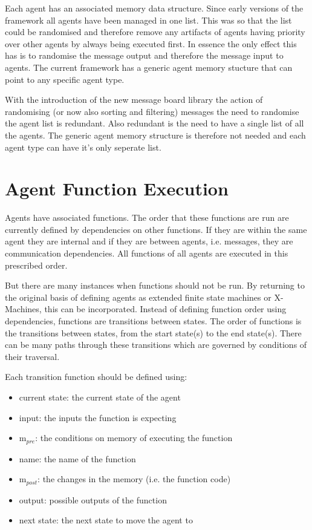 \documentclass[a4paper,12pt]{article}
\begin{document}
Each agent has an associated memory data structure. Since early versions of the framework all agents have been managed in one list. This was so that the list could be randomised and therefore remove any artifacts of agents having priority over other agents by always being executed first. In essence the only effect this has is to randomise the message output and therefore the message input to agents. The current framework has a generic agent memory stucture that can point to any specific agent type.

With the introduction of the new message board library the action of randomising (or now also sorting and filtering) messages the need to randomise the agent list is redundant. Also redundant is the need to have a single list of all the agents. The generic agent memory structure is therefore not needed and each agent type can have it's only seperate list.

\section{Agent Function Execution}

Agents have associated functions. The order that these functions are run are currently defined by dependencies on other functions. If they are within the same agent they are internal and if they are between agents, i.e. messages, they are communication dependencies. All functions of all agents are executed in this prescribed order.

But there are many instances when functions should not be run. By returning to the original basis of defining agents as extended finite state machines or X-Machines, this can be incorporated. Instead of defining function order using dependencies, functions are transitions between states. The order of functions is the transitions between states, from the start state(s) to the end state(s). There can be many paths through these transitions which are governed by conditions of their traversal. 

Each transition function should be defined using:

\begin{itemize}
\item current state: the current state of the agent
\item input: the inputs the function is expecting
\item m$_{pre}$: the conditions on memory of executing the function
\item name: the name of the function
\item m$_{post}$: the changes in the memory (i.e. the function code)
\item output: possible outputs of the function
\item next state: the next state to move the agent to
\end{itemize}
\end{document}
